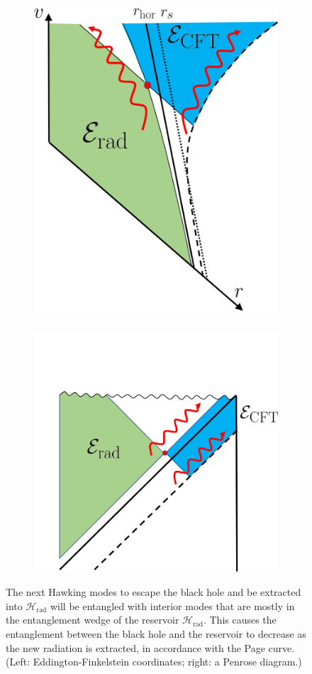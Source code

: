 \documentclass[11pt,a4paper]{article}
\begin{document}
\begin{figure} [t]
\centering
\vspace{0.5cm}
\begin{subfigure}{.48\textwidth}
  \centering
 \includegraphics[width = 0.58\linewidth]{HawkingModes_Eddington.png}
\end{subfigure}
\begin{subfigure}{.48\textwidth}
\vspace{-2cm}
 \includegraphics[width = 0.8\linewidth]{HawkingModes_Penrose.png}
 \centering

\end{subfigure}
\caption{The next Hawking modes to escape the black hole and be extracted into $\mathcal{H}_\text{rad}$ will be entangled with interior modes that are mostly in the entanglement wedge of the reservoir $\mathcal{H}_\text{rad}$. This causes the entanglement between the black hole and the reservoir to decrease as the new radiation is extracted, in accordance with the Page curve. (Left: Eddington-Finkelstein coordinates; right: a Penrose diagram.)}
\label{fig:hawkingmodes}
\end{figure}
\end{document}
